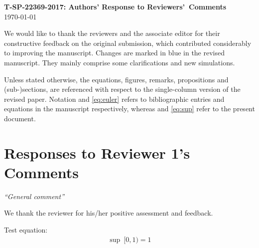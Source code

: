 \documentclass[11pt]{article}
\begin{document}
\begin{center}
\Large \textbf{T-SP-22369-2017: Authors' Response to Reviewers'~Comments}\\
\today
\end{center}
We would like to thank the reviewers and the associate editor for
their constructive feedback on the original submission, which
contributed considerably to improving the manuscript. Changes are
marked in {\color{blue}blue} in the revised manuscript. They mainly
comprise some clarifications and new simulations. 


\noindent Unless stated otherwise, the equations, figures, remarks,
propositions and (sub-)sections, are referenced with respect to the
single-column version of the revised paper. Notation \cite{P-kay1}
and \eqref{eq:euler} refers to bibliographic entries and equations in
the manuscript respectively, whereas \cite{kay2} and \eqref{eq:sup}
refer to the present document. 

\section*{Responses to Reviewer 1's Comments}	

{\it ``General comment''}

\vspace*{0.5em} 
We thank the reviewer for
his/her positive assessment and feedback.

Test equation:
\begin{align}
\label{eq:sup}
\sup ~[0,1) = 1
\end{align}
\end{document}
